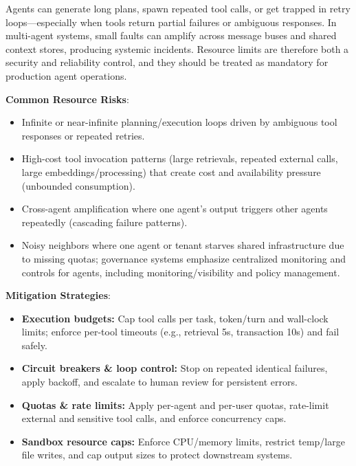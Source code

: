\begin{TNtwocol}
    Agents can generate long plans, spawn repeated tool calls, or get trapped in retry loops—especially when tools return partial failures or ambiguous responses. In multi-agent systems, small faults can amplify across message buses and shared context stores, producing systemic incidents.  Resource limits are therefore both a security and reliability control, and they should be treated as mandatory for production agent operations.

    \textbf{Common Resource Risks}:

    \begin{itemize}
        \item Infinite or near-infinite planning/execution loops driven by ambiguous tool responses or repeated retries.
        \item High-cost tool invocation patterns (large retrievals, repeated external calls, large embeddings/processing) that create cost and availability pressure (unbounded consumption).
        \item Cross-agent amplification where one agent's output triggers other agents repeatedly (cascading failure patterns).
        \item Noisy neighbors where one agent or tenant starves shared infrastructure due to missing quotas; governance systems emphasize centralized monitoring and controls for agents, including monitoring/visibility and policy management.
    \end{itemize}

    \textbf{Mitigation Strategies}:

    \begin{itemize}
        \item \textbf{Execution budgets:} Cap tool calls per task, token/turn and wall-clock limits; enforce per-tool timeouts (e.g., retrieval 5s, transaction 10s) and fail safely.
        \item \textbf{Circuit breakers \& loop control:} Stop on repeated identical failures, apply backoff, and escalate to human review for persistent errors.
        \item \textbf{Quotas \& rate limits:} Apply per-agent and per-user quotas, rate-limit external and sensitive tool calls, and enforce concurrency caps.
        \item \textbf{Sandbox resource caps:} Enforce CPU/memory limits, restrict temp/large file writes, and cap output sizes to protect downstream systems.
    \end{itemize}


\end{TNtwocol}
